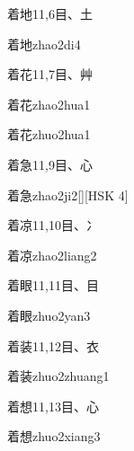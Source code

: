 \begin{entry}{着地}{11,6}{⽬、⼟}
  \begin{phonetics}{着地}{zhao2di4}
  \end{phonetics}
\end{entry}

\begin{entry}{着花}{11,7}{⽬、⾋}
  \begin{phonetics}{着花}{zhao2hua1}
  \end{phonetics}
  \begin{phonetics}{着花}{zhuo2hua1}
  \end{phonetics}
\end{entry}

\begin{entry}{着急}{11,9}{⽬、⼼}
  \begin{phonetics}{着急}{zhao2ji2}[][HSK 4]
  \end{phonetics}
\end{entry}

\begin{entry}{着凉}{11,10}{⽬、⼎}
  \begin{phonetics}{着凉}{zhao2liang2}
  \end{phonetics}
\end{entry}

\begin{entry}{着眼}{11,11}{⽬、⽬}
  \begin{phonetics}{着眼}{zhuo2yan3}
  \end{phonetics}
\end{entry}

\begin{entry}{着装}{11,12}{⽬、⾐}
  \begin{phonetics}{着装}{zhuo2zhuang1}
  \end{phonetics}
\end{entry}

\begin{entry}{着想}{11,13}{⽬、⼼}
  \begin{phonetics}{着想}{zhuo2xiang3}
  \end{phonetics}
\end{entry}

